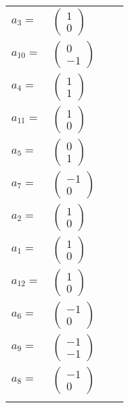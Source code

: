 \documentclass[1p]{elsarticle_modified}
\theoremstyle{definition}
\begin{document}
\begin{tabular}{m{7pt} m{180pt} m{7pt} m{180pt} }
\flushright $a_{3}=$&$\begin{pmatrix}1\\0\end{pmatrix}$ \\
\flushright $a_{10}=$&$\begin{pmatrix}0\\-1\end{pmatrix}$ \\
\flushright $a_{4}=$&$\begin{pmatrix}1\\1\end{pmatrix}$ \\
\flushright $a_{11}=$&$\begin{pmatrix}1\\0\end{pmatrix}$ \\
\flushright $a_{5}=$&$\begin{pmatrix}0\\1\end{pmatrix}$ \\
\flushright $a_{7}=$&$\begin{pmatrix}-1\\0\end{pmatrix}$ \\
\flushright $a_{2}=$&$\begin{pmatrix}1\\0\end{pmatrix}$ \\
\flushright $a_{1}=$&$\begin{pmatrix}1\\0\end{pmatrix}$ \\
\flushright $a_{12}=$&$\begin{pmatrix}1\\0\end{pmatrix}$ \\
\flushright $a_{6}=$&$\begin{pmatrix}-1\\0\end{pmatrix}$ \\
\flushright $a_{9}=$&$\begin{pmatrix}-1\\-1\end{pmatrix}$ \\
\flushright $a_{8}=$&$\begin{pmatrix}-1\\0\end{pmatrix}$\\&\end{tabular}
\end{document}
